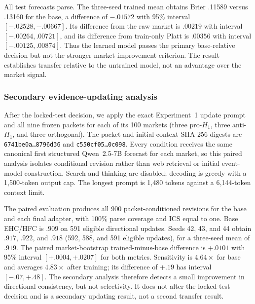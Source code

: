 All test forecasts parse. The three-seed trained mean obtains Brier .11589 versus
.13160 for the base, a
difference of $-.01572$ with 95\% interval $[-.02528,-.00667]$. Its difference
from the raw market is $.00219$ with interval $[-.00264,.00721]$, and its
difference from train-only Platt is $.00356$ with interval
$[-.00125,.00874]$. Thus the learned model passes the primary base-relative
decision but not the stronger market-improvement criterion.
The result establishes transfer relative to the untrained model, not an advantage
over the market signal.

\begin{center}
\begin{minipage}{.9\linewidth}
\centering
{}
\label{tab:exp3b-seed-results}
\scriptsize
\setlength{\tabcolsep}{3.5pt}
\resizebox{\linewidth}{!}{%

}
\end{minipage}
\end{center}

\subsubsection{Secondary evidence-updating analysis}
\label{app:exp3b-update}
After the locked-test decision, we apply the exact Experiment~1 update prompt and
all nine frozen packets for each of its 100 markets (three pro-$H_1$, three
anti-$H_1$, and three orthogonal). The packet and initial-context SHA-256 digests
are \texttt{6741be0a\ldots8796d36} and
\texttt{c550cf05\ldots0c098}. Every condition receives the same canonical first
structured Qwen~2.5-7B forecast for each market, so this paired analysis isolates
conditional revision rather than web retrieval or initial event-model
construction. Search and thinking are disabled; decoding is greedy with a
1,500-token output cap. The longest prompt is 1,480 tokens against a 6,144-token
context limit.

The paired evaluation produces all 900 packet-conditioned revisions for the base
and each final adapter, with 100\% parse coverage and ICS equal to one. Base
EHC/HFC is $.909$ on 591 eligible directional updates. Seeds 42, 43, and 44 obtain
$.917$, $.922$, and $.918$ (592, 588, and 591 eligible updates), for a
three-seed mean of $.919$. The paired market-bootstrap trained-minus-base
difference is $+.0101$ with 95\% interval $[+.0004,+.0207]$ for both metrics.
Sensitivity is $4.64\times$ for base and averages $4.83\times$ after training;
its difference of $+.19$ has interval $[-.07,+.48]$. The secondary analysis
therefore detects a small improvement in directional consistency, but not
selectivity. It does not alter the locked-test decision and is a secondary
updating result, not a second transfer result.

